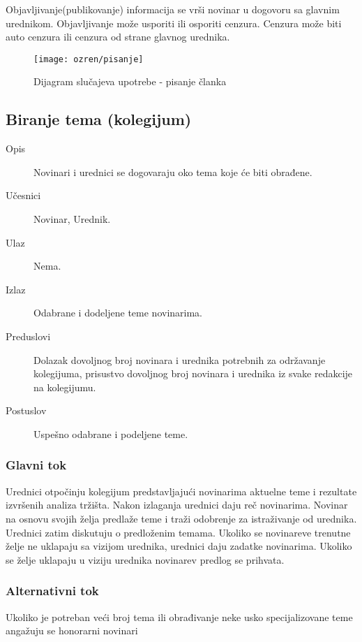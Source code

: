 Objavljivanje(publikovanje) informacija se vrši novinar u dogovoru sa glavnim u\-red\-ni\-kom. Objavljivanje može usporiti ili osporiti cenzura. Cenzura može biti auto cenzura ili cenzura od strane glavnog urednika. \\


\begin{figure}[h]
    \centering
    \texttt{[image: ozren/pisanje]}
    \caption{Dijagram slučajeva upotrebe - pisanje članka}
    \label{pisanje}
\end{figure}

\subsection{Biranje tema (kolegijum)}

\begin{description}
\item [Opis] Novinari i urednici se dogovaraju oko tema koje će biti obrađene.
\item [Učesnici] Novinar, Urednik.
\item [Ulaz] Nema.
\item [Izlaz] Odabrane i dodeljene teme novinarima.
\item [Preduslovi] Dolazak dovoljnog broj novinara i urednika potrebnih za održavanje kolegijuma, prisustvo dovoljnog broj  novinara i urednika iz svake redakcije na kolegijumu.
\item [Postuslov] Uspešno odabrane i podeljene teme.
\end{description}      

\subsubsection{Glavni tok}
Urednici otpočinju kolegijum predstavljajući novinarima aktuelne teme i rezultate izvršenih analiza tržišta. Nakon izlaganja urednici daju reč novinarima. Novinar na osnovu svojih želja predlaže teme i traži odobrenje za istraživanje od urednika. Urednici zatim diskutuju o predloženim temama. Ukoliko se novinareve trenutne želje ne uklapaju sa vizijom urednika, urednici daju zadatke novinarima. Ukoliko se želje uklapaju u viziju urednika novinarev predlog se prihvata.
\subsubsection{Alternativni tok}
Ukoliko je potreban veći broj tema ili obrađivanje neke usko specijalizovane teme angažuju se honorarni novinari

